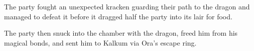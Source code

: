 The party fought an unexpected kracken guarding their path to the dragon and managed to defeat it before it dragged half the party into its lair for food.

The party then snuck into the chamber with the dragon, freed him from his magical bonds, and sent him to Kalkum via Ora's escape ring.
